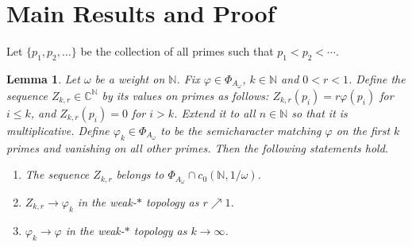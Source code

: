 \documentclass{amsart}
\newtheorem{lemma}[theorem]{Lemma}
\theoremstyle{definition}
\theoremstyle{remark}
\numberwithin{equation}{section}
\begin{document}
\section{Main Results and Proof}
Let $\{p_1,p_2,\ldots\}$ be the collection of all primes such that $p_1<p_2<\cdots$.
\begin{lemma}\label{lem:character_approx}
Let $\omega$ be a weight on $\mathbb N$. Fix $\varphi \in \Phi_{A_\omega}$, $k \in \mathbb N$ and $0 < r < 1$. Define the sequence $Z_{k,r} \in \mathbb C^{\mathbb N}$ by its values on primes as follows: $Z_{k,r}(p_i) = r \varphi(p_i)$ for $i \leq k$, and $Z_{k,r}(p_i) = 0$ for $i > k$. Extend it to all $n \in \mathbb N$ so that it is multiplicative. Define $\varphi_k \in \Phi_{A_\omega}$ to be the semicharacter matching $\varphi$ on the first $k$ primes and vanishing on all other primes. Then the following statements hold.
\begin{enumerate}
    \item The sequence $Z_{k,r}$ belongs to $\Phi_{A_\omega} \cap c_0(\mathbb N, 1/\omega)$.
    \item $Z_{k,r}\to\varphi_k$ in the weak-$\ast$ topology as $r \nearrow 1$.
    \item $\varphi_k\to\varphi$ in the weak-$\ast$ topology as $k \to \infty$.
\end{enumerate}
\end{lemma}
\end{document}
